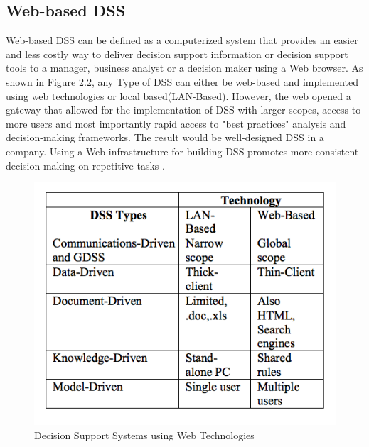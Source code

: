 \subsection{Web-based DSS}
\indent Web-based DSS can be defined as a computerized system that provides an easier and less costly way to deliver decision support information or decision support tools to a manager, business analyst or a decision maker using a Web browser. As shown in Figure 2.2, any Type of DSS can either be web-based and implemented using web technologies or local based(LAN-Based). However, the web  opened a gateway that allowed for the implementation of DSS with larger scopes, access to more users and most importantly rapid access to "best practices" analysis and decision-making frameworks. The result would be well-designed DSS in a company. Using a Web infrastructure for building DSS promotes more consistent decision making on repetitive tasks \cite{power2000web}.
\begin{figure}[H]
\centering
\includegraphics[scale=0.5]{Images/Web-based.png}
\caption[Decision Support Systems using Web Technologies]{Decision Support Systems using Web Technologies \cite{power2000web}}
\end{figure}
